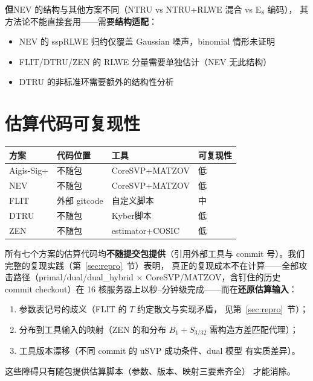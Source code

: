 \documentclass[11pt,a4paper]{ctexart}
\begin{document}
\textbf{但}NEV 的结构与其他方案不同（NTRU vs NTRU+RLWE 混合 vs E$_8$ 编码），
其方法论不能直接套用——需要\textbf{结构适配}：
\begin{itemize}
\item NEV 的 sspRLWE 归约仅覆盖 Gaussian 噪声，binomial 情形未证明
\item FLIT/DTRU/ZEN 的 RLWE 分量需要单独估计（NEV 无此结构）
\item DTRU 的非标准环需要额外的结构性分析
\end{itemize}

\section{估算代码可复现性}

\begin{table}[htbp]\centering\small
\begin{tabular}{@{}llll@{}}
\toprule
方案 & 代码位置 & 工具 & 可复现性 \\
\midrule
Aigis-Sig+ & 不随包 & CoreSVP+MATZOV & 低 \\
NEV & 不随包 & CoreSVP+MATZOV & 低 \\
FLIT & 外部 gitcode & 自定义脚本 & 中 \\
DTRU & 不随包 & Kyber脚本 & 低 \\
ZEN & 不随包 & estimator+COSIC & 低 \\
\bottomrule
\end{tabular}
\end{table}

\begin{warnbox}
所有七个方案的估算代码均\textbf{不随提交包提供}（引用外部工具与
commit 号）。我们完整的复现实践（第~\ref{sec:repro}~节）表明，
真正的复现成本不在计算——全部攻击路径（primal/dual/dual\_hybrid
$\times$ CoreSVP/MATZOV，含钉住的历史 commit checkout）在
16 核服务器上以秒--分钟级完成——而在\textbf{还原估算输入}：
\begin{enumerate}
\item 参数表记号的歧义（FLIT 的 $T$ 约定散文与实现矛盾，
      见第~\ref{sec:repro}~节）；
\item 分布到工具输入的映射（ZEN 的和分布 $B_1{+}S_{3/32}$
      需构造方差匹配代理）；
\item 工具版本漂移（不同 commit 的 uSVP 成功条件、dual 模型
      有实质差异）。
\end{enumerate}
这些障碍只有随包提供估算脚本（参数、版本、映射三要素齐全）
才能消除。
\end{warnbox}
\end{document}
